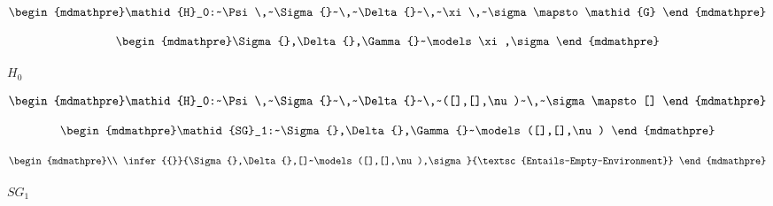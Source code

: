 \documentclass[10pt]{book}
\begin{document}
\begin{mdSnippets}
\begin{mdDisplaySnippet}[77d428c56837ea1299ff69aa359aa31a]
\end{mdDisplaySnippet}%
\begin{mdDisplaySnippet}[275afa657a30df60687a0193f5111fd8]%
\[%
\begin{mdmathpre}%
\mathid{H}_0:~\Psi \,~\Sigma{}~\,~\Delta{}~\,~\xi \,~\sigma \mapsto \mathid{G}
\end{mdmathpre}%
\]%
\end{mdDisplaySnippet}%
\begin{mdDisplaySnippet}[8f3dba8fe80b7f8337e23ec05598f684]%
\[%
\begin{mdmathpre}%
\Sigma{},\Delta{},\Gamma{}~\models \xi,\sigma
\end{mdmathpre}%
\]%
\end{mdDisplaySnippet}%
\begin{mdInlineSnippet}[e65765bedcabe42c66ec93228769e82a]%
$H_0$\end{mdInlineSnippet}%
\begin{mdDisplaySnippet}%
\[%
\begin{mdmathpre}%
\mathid{H}_0:~\Psi \,~\Sigma{}~\,~\Delta{}~\,~([],[],\nu)~\,~\sigma \mapsto []
\end{mdmathpre}%
\]%
\end{mdDisplaySnippet}%
\begin{mdDisplaySnippet}[174bbce0a501f1a5926d8c9c79f24018]%
\[%
\begin{mdmathpre}%
\mathid{SG}_1:~\Sigma{},\Delta{},\Gamma{}~\models ([],[],\nu)
\end{mdmathpre}%
\]%
\end{mdDisplaySnippet}%
\begin{mdDisplaySnippet}%
\[%
\begin{mdmathpre}%
\\
\infer{{}}{\Sigma{},\Delta{},[]~\models ([],[],\nu),\sigma}{\textsc{Entails-Empty-Environment}}
\end{mdmathpre}%
\]%
\end{mdDisplaySnippet}%
\begin{mdInlineSnippet}[34b9b497f78f1e6e6843dc627bbbf47e]%
$SG_1$\end{mdInlineSnippet}%

\end{mdSnippets}
\end{document}
